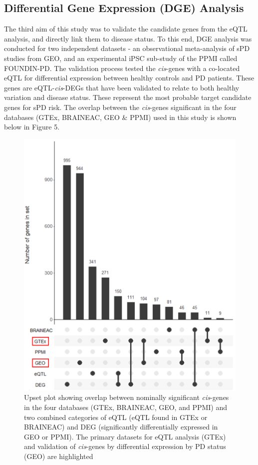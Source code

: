 \documentclass{article}
\begin{document}
\subsection{Differential Gene Expression (DGE) Analysis}
\label{subsec:DGE}
The third aim of this study was to validate the candidate genes from the eQTL analysis, and directly link them to disease status. To this end, DGE analysis was conducted for two independent datasets - an observational meta-analysis of sPD studies from GEO\cite{Barrett2012NCBISetsupdate}, and an experimental iPSC sub-study of the PPMI called FOUNDIN-PD\cite{Bressan2023TheMechanism}. The validation process tested the \textit{cis}-genes with a co-located eQTL for differential expression between healthy controls and PD patients. These genes are eQTL-\textit{cis}-DEGs that have been validated to relate to both healthy variation and disease status. These represent the most probable target candidate genes for sPD risk. The overlap between the \textit{cis}-genes significant in the four databases (GTEx, BRAINEAC, GEO \& PPMI) used in this study is shown below in Figure 5.
\newpage
\begin{figure}[!h]
    \centering
    \includegraphics[width=1\linewidth]{Thesis/thesis images/Upsetplot.png}
    \caption{Upset plot\cite{Conway2017UpSetR:Properties.} showing overlap between nominally significant \textit{cis}-genes in the four databases (GTEx, BRAINEAC, GEO, and PPMI) and two combined categories of eQTL (eQTL found in GTEx or BRAINEAC) and DEG (significantly differentially expressed in GEO or PPMI). The primary datasets for eQTL analysis (GTEx) and validation of \textit{cis}-genes by differential expression by PD status (GEO) are highlighted}
    \label{fig:enter-label}
\end{figure}
\end{document}
